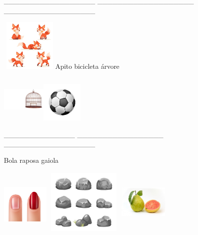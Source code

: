 \_\_\_\_\_\_\_\_\_\_\_\_\_\_\_\_\_\_
\_\_\_\_\_\_\_\_\_\_\_\_\_\_\_\_\_\_\_
\_\_\_\_\_\_\_\_\_\_\_\_\_\_\_\_\_\_

\includegraphics[width=1.10833in,height=1.00903in]{media/image52.jpeg}Apito
bicicleta árvore

\includegraphics[width=0.85556in,height=0.92222in]{media/image53.jpeg}\includegraphics[width=0.79808in,height=0.79808in]{media/image54.jpeg}

\_\_\_\_\_\_\_\_\_\_\_\_\_\_ \_\_\_\_\_\_\_\_\_\_\_\_\_\_\_\_\_
\_\_\_\_\_\_\_\_\_\_\_\_\_\_\_\_\_\_

Bola raposa gaiola

\includegraphics[width=0.91319in,height=1.16319in]{media/image55.jpeg}\includegraphics[width=1.62569in,height=1.25000in]{media/image56.jpeg}\includegraphics[width=0.93990in,height=1.27885in]{media/image57.jpeg}

